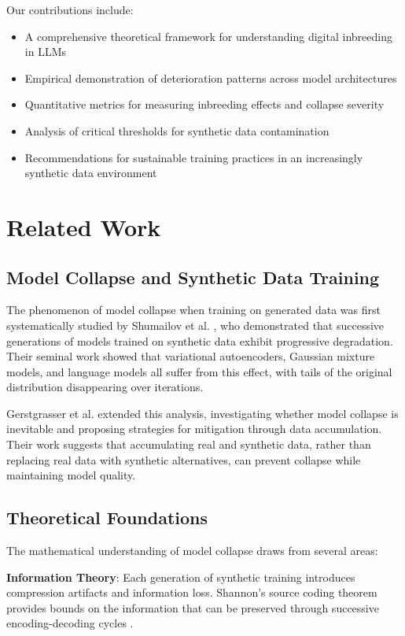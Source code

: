 \documentclass{article}
\begin{document}
Our contributions include:

\begin{itemize}
\item A comprehensive theoretical framework for understanding digital inbreeding in LLMs
\item Empirical demonstration of deterioration patterns across model architectures
\item Quantitative metrics for measuring inbreeding effects and collapse severity
\item Analysis of critical thresholds for synthetic data contamination
\item Recommendations for sustainable training practices in an increasingly synthetic data environment
\end{itemize}

\section{Related Work}

\subsection{Model Collapse and Synthetic Data Training}

The phenomenon of model collapse when training on generated data was first systematically studied by Shumailov et al. \cite{shumailov2023curse}, who demonstrated that successive generations of models trained on synthetic data exhibit progressive degradation. Their seminal work showed that variational autoencoders, Gaussian mixture models, and language models all suffer from this effect, with tails of the original distribution disappearing over iterations.

Gerstgrasser et al. \cite{gerstgrasser2024model} extended this analysis, investigating whether model collapse is inevitable and proposing strategies for mitigation through data accumulation. Their work suggests that accumulating real and synthetic data, rather than replacing real data with synthetic alternatives, can prevent collapse while maintaining model quality.

\subsection{Theoretical Foundations}

The mathematical understanding of model collapse draws from several areas:

\textbf{Information Theory}: Each generation of synthetic training introduces compression artifacts and information loss. Shannon's source coding theorem provides bounds on the information that can be preserved through successive encoding-decoding cycles \cite{shannon1948mathematical}.
\end{document}
